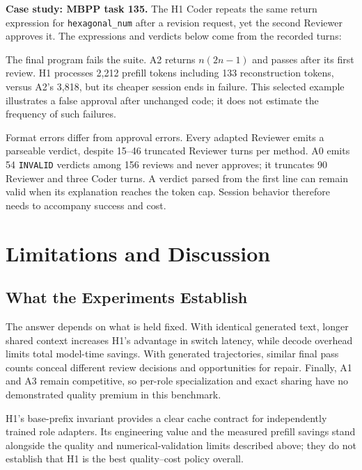 \documentclass[10pt,twocolumn,letterpaper]{article}
\begin{document}
\par\medskip
\noindent\begin{minipage}{\columnwidth}
\textbf{Case study: MBPP task 135.}
The H1 Coder repeats the same return expression for
\texttt{hexagonal\_num} after a revision request, yet the second Reviewer
approves it. The expressions and verdicts below come from the recorded turns:
\begin{quote}
\small

\end{quote}
The final program fails the suite. A2 returns $n(2n-1)$ and passes after its
first review. H1 processes 2,212 prefill tokens including 133 reconstruction
tokens, versus A2's 3,818, but its cheaper session ends in failure. This
selected example illustrates a false approval after unchanged code;
it does not estimate the frequency of such failures.
\end{minipage}
\par\medskip

Format errors differ from approval errors. Every adapted Reviewer emits a
parseable verdict, despite 15--46 truncated Reviewer turns per method.
A0 emits 54 \texttt{INVALID} verdicts among 156 reviews and never approves;
it truncates 90 Reviewer and three Coder turns. A verdict parsed from the
first line can remain valid when its explanation reaches the token cap.
Session behavior therefore needs to accompany success and cost.

\section{Limitations and Discussion}
\subsection{What the Experiments Establish}
The answer depends on what is held fixed. With identical generated text,
longer shared context increases H1's advantage in switch latency, while
decode overhead limits total model-time savings. With generated
trajectories, similar final pass counts conceal different review decisions
and opportunities for repair. Finally, A1 and A3 remain competitive, so
per-role specialization and exact sharing have no demonstrated quality
premium in this benchmark.

H1's base-prefix invariant provides a clear cache contract for independently
trained role adapters. Its engineering value and the measured prefill savings
stand alongside the quality and numerical-validation limits described above;
they do not establish that H1 is the best quality--cost policy overall.
\end{document}

